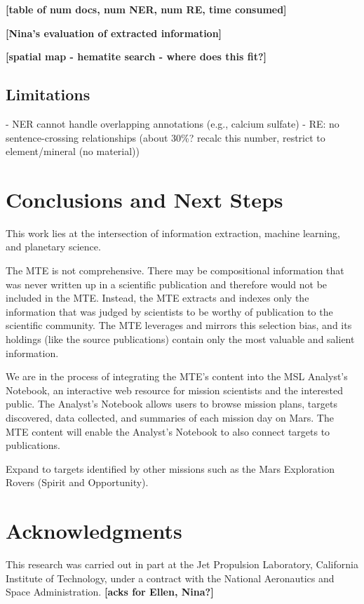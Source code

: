 \documentclass[letterpaper]{article} %
\begin{document}
{\bf [table of num docs, num NER, num RE, time consumed]}

{\bf [Nina's evaluation of extracted information]}

{\bf [spatial map - hematite search - where does this fit?]}

\subsection{Limitations}
- NER cannot handle overlapping annotations (e.g., calcium sulfate)
- RE: no sentence-crossing relationships (about 30\%? recalc this
  number, restrict to element/mineral (no material))

\section{Conclusions and Next Steps}

This work lies at the intersection of information extraction, machine
learning, and planetary science.  

The MTE is not comprehensive.  There may be compositional information
that was never written up in a scientific publication and therefore
would not be included in the MTE.  Instead, the MTE extracts and
indexes only the information that was judged by scientists to be
worthy of publication to the scientific community.  The MTE leverages
and mirrors this selection bias, and its holdings (like the source
publications) contain only the most valuable and salient information.

We are in the process of integrating the MTE's content into the MSL
Analyst's Notebook, an interactive web resource for mission scientists
and the interested public.  The Analyst's Notebook allows users to
browse mission plans, targets discovered, data collected, and
summaries of each mission day on Mars.  The MTE content will enable
the Analyst's Notebook to also connect targets to publications.

Expand to targets identified by other missions such as the Mars
Exploration Rovers (Spirit and Opportunity).

\section{Acknowledgments}
This research was carried out in part at the Jet Propulsion Laboratory,
California Institute of Technology, under a contract with the National
Aeronautics and Space Administration.  {\bf [acks for Ellen, Nina?]}



\end{document}
